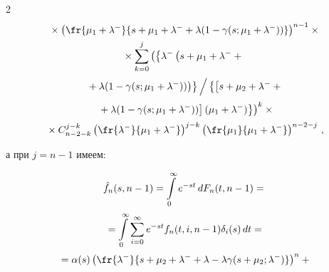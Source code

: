 \begin{multicols}{2}
\begin{multline*}
{}\times


\left(\fr{\mu_1+\lambda^- }{s + \mu_1 + \lambda^- + \lambda (1 - \gamma(s;\mu_1 + \lambda^-))}\right)^{n-1}


\times{}


\\


{}\times


\sum\limits_{k=0}^{j} \left(


\left\{\lambda^- \left(s + \mu_1 + \lambda^- +{}\right.\right.\right.\\[2pt]


\left.\left.{}+ \lambda (1 - \gamma(s;\mu_1 + \lambda^-))\right) \right\}\Big / 


\left\{\left[s + \mu_2 + \lambda^- +{}\right.\right.\\[2pt] 


\left.\left.\left.{}+\lambda (1 - \gamma(s;\mu_1 + \lambda^-))\right]


(\mu_1+\lambda^-)\right\}\right)^{k}\times{}\\[2pt]


{}\times


C_{n-2-k}^{j-k} \left(\fr{\lambda^-}{\mu_1 + \lambda^-}\right)^{j-k}


          \left(\fr{\mu_1 }{\mu_1 + \lambda^-}\right)^{n-2-j}\,,


\end{multline*}


а при $j=n-1$ имеем:





\noindent


\begin{multline*}


\hat f_n(s,n-1)=\int\limits_{0}^\infty e^{-st} \,dF_n(t,n-1)={}


\\[2pt]


{}=


\int\limits_{0}^{\infty}\sum\limits_{i=0}^{\infty}


e^{-st} f_n(t,i,n-1) \delta_i(s)\, dt={}\\[2pt]


{}=


\alpha (s) \left (


\fr{\lambda^- }{s+\mu_2+\lambda^- + \lambda - \lambda \gamma(s+\mu_2;\lambda^-) }


\right )^{n}


+{}\\[2pt]



\end{multline*}
\end{multicols}
